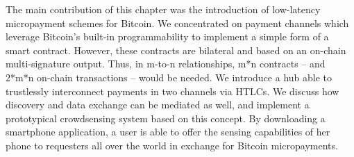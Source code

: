 The main contribution of this chapter was the introduction of low-latency micropayment schemes for Bitcoin. We concentrated on payment channels which leverage Bitcoin's built-in programmability to implement a simple form of a smart contract. However, these contracts are bilateral and based on an on-chain multi-signature output. Thus, in m-to-n relationships, m*n contracts -- and 2*m*n on-chain transactions -- would be needed. We introduce a hub able to trustlessly interconnect payments in two channels via \ac{HTLC}s. We discuss how discovery and data exchange can be mediated as well, and implement a prototypical crowdsensing system based on this concept. By downloading a smartphone application, a user is able to offer the sensing capabilities of her phone to requesters all over the world in exchange for Bitcoin micropayments. 




